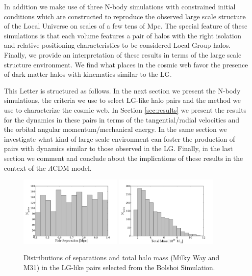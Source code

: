 \documentclass{emulateapj}
\begin{document}
In addition we make use of three N-body simulations with constrained initial conditions which are constructed to reproduce the observed large scale structure of the Local Universe on scales of a few tens of Mpc. The special feature of these simulations is that each volume features a pair of halos with the right isolation and relative positioning characteristics to be considered Local Group halos.  Finally, we provide an interpretation of these results in terms of the large scale structure environment. We find what places in the cosmic web favor the presence of dark matter halos with kinematics similar to the LG.

This Letter is structured as follows. In the next section we present the N-body simulations, the criteria we use to select LG-like halo pairs and the method we use to characterize the cosmic web. In Section \ref{sec:results} we present the results for the dynamics in these pairs in terms of the tangential/radial velocities and the orbital angular momentum/mechanical energy. In the same section we investigate what kind of large scale environment can foster the production of pairs with dynamics similar to those observed in the LG. Finally, in the last section we comment and conclude about the implications of these results in the context of the $\Lambda$CDM model.





\label{subsec:lg-sample}
\begin{figure}
\begin{center}
\includegraphics[keepaspectratio=true,width=0.45\textwidth]{./figures/separation_BDM.pdf}
\includegraphics[keepaspectratio=true,width=0.45\textwidth]{./figures/total_mass_BDM.pdf}
\caption{\label{fig:distros} Distributions of separations and total halo mass (Milky Way and M31) in the LG-like pairs selected from the Bolshoi Simulation.}
\end{center}
\end{figure}
\end{document}
